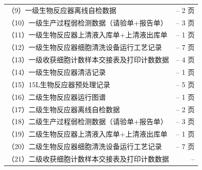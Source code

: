 \documentclass[UTF8,10pt,a4paper,fontset=fandol]{ctexart}
\newcommand{\fieldvalue}[1]{#1}
\newcommand{\handwritten}[1]{#1}
\begin{document}
\begin{tabular}{@{}p{}r@{}}
（9）一级生物反应器离线自检数据 &
--\quad
\fieldvalue{\handwritten{2}} 页
\\
（10）一级生产过程弱检测数据（请验单+报告单） &
--\quad
\fieldvalue{\handwritten{3}} 页
\\
（11）一级生物反应器上清液入库单+上清液出库单 &
--\quad
\fieldvalue{\handwritten{1}} 页
\\
（12）一级生物反应器细胞清洗设备运行工艺记录 &
--\quad
\fieldvalue{\handwritten{7}} 页
\\
（13）一级收获细胞计数样本交接表及打印计数数据 &
--\quad
\fieldvalue{\handwritten{4}} 页
\\
（14）一级生物反应器清洁记录 &
--\quad
\fieldvalue{\handwritten{1}} 页
\\
（15）15L生物反应器预处理记录 &
--\quad
\fieldvalue{\handwritten{5}} 页
\\
（16）二级生物反应器运行图谱 &
--\quad
\fieldvalue{\handwritten{1}} 页
\\
（17）二级生物反应器离线自检数据 &
--\quad
\fieldvalue{\handwritten{2}} 页
\\
（18）二级生产过程弱检测数据（请验单+报告单） &
--\quad
\fieldvalue{\handwritten{3}} 页
\\
（19）二级生物反应器上清液入库单+上清液出库单 &
--\quad
\fieldvalue{\handwritten{1}} 页
\\
（20）二级生物反应器细胞清洗设备运行工艺记录 &
--\quad
\fieldvalue{\handwritten{7}} 页
\\
（21）二级收获细胞计数样本交接表及打印计数数据 &
--\quad

\end{tabular}
\end{document}
